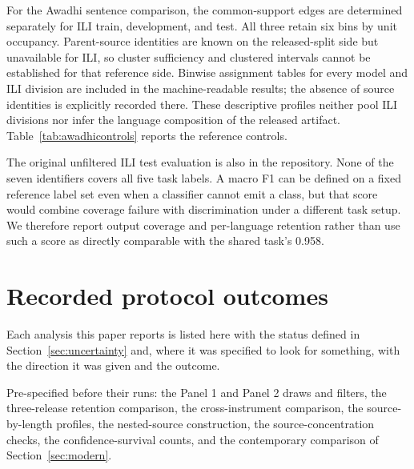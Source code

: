 \documentclass[final]{clv2025}
\newcommand{\fitexhibit}[1]{\sbox{\exhibitbox}{}\ifdim\wd\exhibitbox>\linewidth\resizebox{\linewidth}{!}{\usebox{\exhibitbox}}\else\usebox{\exhibitbox}\fi}
\newcommand{\exhibit}[1]{\fitexhibit{tables/#1.tex}}
\begin{document}
For the Awadhi sentence comparison, the common-support edges are determined separately for ILI train, development, and test. All three retain six bins by unit occupancy. Parent-source identities are known on the released-split side but unavailable for ILI, so cluster sufficiency and clustered intervals cannot be established for that reference side. Binwise assignment tables for every model and ILI division are included in the machine-readable results; the absence of source identities is explicitly recorded there. These descriptive profiles neither pool ILI divisions nor infer the language composition of the released artifact. Table~\ref{tab:awadhicontrols} reports the reference controls.

\begin{table}[htbp]
\centering\small
\exhibit{awadhi_controls}
\caption{Awadhi reference controls, with original ILI divisions preserved. The same verified binaries reproduce all archived labels on these units. Rates concern the filtered panel cells, not the entire unfiltered shared-task corpus.}
\label{tab:awadhicontrols}
\end{table}

The original unfiltered ILI test evaluation is also in the repository. None of the seven identifiers covers all five task labels. A macro F1 can be defined on a fixed reference label set even when a classifier cannot emit a class, but that score would combine coverage failure with discrimination under a different task setup. We therefore report output coverage and per-language retention rather than use such a score as directly comparable with the shared task's 0.958.

\FloatBarrier
\section{Recorded protocol outcomes}\label{app:protocols}

Each analysis this paper reports is listed here with the status defined in Section~\ref{sec:uncertainty} and, where it was specified to look for something, with the direction it was given and the outcome.

Pre-specified before their runs: the Panel 1 and Panel 2 draws and filters, the three-release retention comparison, the cross-instrument comparison, the source-by-length profiles, the nested-source construction, the source-concentration checks, the confidence-survival counts, and the contemporary comparison of Section~\ref{sec:modern}.
\end{document}

